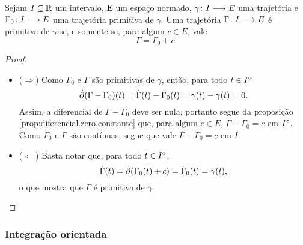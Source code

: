 \begin{proposition}
\label{prop:trajetoria.continua.primitiva.unicidade}
Sejam $I \subseteq \mathbb{R}$ um intervalo, $\bm E$ um espaço normado, $\gamma\colon \allowbreak I \longrightarrow E$ uma trajetória e $\Gamma_0\colon \allowbreak I \longrightarrow E$ uma trajetória primitiva de $\gamma$. Uma trajetória $\Gamma\colon \allowbreak I \longrightarrow E$ é primitiva de $\gamma$ se, e somente se, para algum $c \in E$, vale
	\begin{equation*}
	\Gamma = \Gamma_0 + c.
	\end{equation*}
\end{proposition}
\begin{proof}
	\begin{itemize}
	\item ($\Rightarrow$) Como $\Gamma_0$ e $\Gamma$ são primitivas de $\gamma$, então, para todo $t \in {I}^\circ$
		\begin{equation*}
		\dot{\partial}(\Gamma - \Gamma_0)(t) = \dot \Gamma(t) - \dot \Gamma_0(t) = \gamma(t) - \gamma(t) = 0.
		\end{equation*}
	Assim, a diferencial de $\Gamma - \Gamma_0$ deve ser nula, portanto segue da proposição \ref{prop:diferencial.zero.constante} que, para algum $c \in E$, $\Gamma - \Gamma_0 = c$ em ${I}^\circ$. Como $\Gamma_0$ e $\Gamma$ são contínuas, segue que vale $\Gamma - \Gamma_0 = c$ em $I$.

	\item ($\Leftarrow$) Basta notar que, para todo $t \in {I}^\circ$,
		\begin{equation*}
		\dot \Gamma(t) = \dot{\partial} (\Gamma_0(t) + c) = \dot \Gamma_0(t) = \gamma(t),
		\end{equation*}
	o que mostra que $\Gamma$ é primitiva de $\gamma$. \qedhere
	\end{itemize}
\end{proof}

\subsubsection{Integração orientada}


